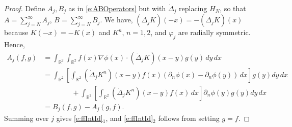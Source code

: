\documentclass[11pt,reqno,xcolor=svgnames]{amsart}
\def\R{{\mathbb R}}
\theoremstyle{plain}
\theoremstyle{definition}
\theoremstyle{plain}
\theoremstyle{remark}
\newcommand{\iny}{\ensuremath{\infty}}
\newcommand{\grad}{\ensuremath{\nabla}}
\newcommand{\prt}{\ensuremath{\partial}}
\newcommand{\brac}[1]{\ensuremath{\left[ #1 \right]}}
\newcommand{\Del}{\dot{\Delta}}
\begin{document}
\begin{proof}
    Define $A_j, B_j$ as in \cref{e:ABOperators} but with $\Del_j$ replacing $H_N$, so that $A = \sum_{j = N}^\iny A_j$, $B = \sum_{j = N}^\iny B_j$.
    We have, $(\Del_j K)(-x) = - (\Del_j K)(x)$
	because $K(-x) = -K(x)$ and $K^n$, $n = 1, 2$, and $\varphi_j$ are radially symmetric.
    Hence,
    \begin{align*}
        A_j(f, g)
             &= \int_{\R^2} \int_{\R^2} f(x) \grad \phi(x) \cdot 
                    (\Del_j K)(x - y) g(y) \, dy
				\, dx \\
            &= \int_{\R^2} \brac{\int_{\R^2}
                    (\Del_j K^n)(x - y) f(x) (\prt_n \phi(x) - \prt_n \phi(y)) \, dx}
                    g(y) dy
				\, dx \\
            &\qquad\qquad
                + \int_{\R^2} \brac{\int_{\R^2}
                    (\Del_j K^n)(x - y) f(x) \, dx} \prt_n \phi(y)
                    g(y) dy
				\, dx \\
            &= B_j(f, g) - A_j(g, f).
    \end{align*}
    Summing over $j$ gives \cref{e:ffIntId}$_1$, and \cref{e:ffIntId}$_2$ follows from setting $g = f$.
	

\end{proof}
\end{document}
